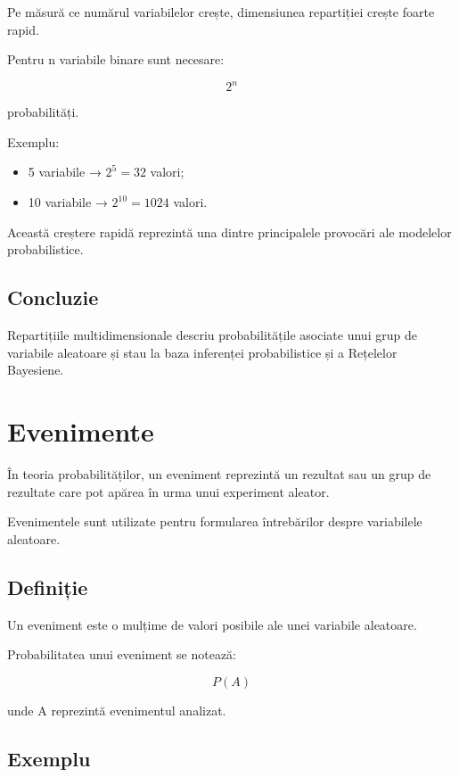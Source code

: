 \documentclass[12pt,a4paper]{article}
\begin{document}
Pe măsură ce numărul variabilelor crește, dimensiunea repartiției crește foarte rapid.

Pentru n variabile binare sunt necesare:

\[
2^n
\]

probabilități.

Exemplu:

\begin{itemize}
\item 5 variabile → $2^5=32$ valori;
\item 10 variabile → $2^{10}=1024$ valori.
\end{itemize}

Această creștere rapidă reprezintă una dintre principalele provocări ale modelelor probabilistice.

\subsection{Concluzie}

Repartițiile multidimensionale descriu probabilitățile asociate unui grup de variabile aleatoare și stau la baza inferenței probabilistice și a Rețelelor Bayesiene.








\section{Evenimente}

În teoria probabilităților, un eveniment reprezintă un rezultat sau un grup de rezultate care pot apărea în urma unui experiment aleator.

Evenimentele sunt utilizate pentru formularea întrebărilor despre variabilele aleatoare.

\subsection{Definiție}

Un eveniment este o mulțime de valori posibile ale unei variabile aleatoare.

Probabilitatea unui eveniment se notează:

\[
P(A)
\]

unde A reprezintă evenimentul analizat.

\subsection{Exemplu}
\end{document}
